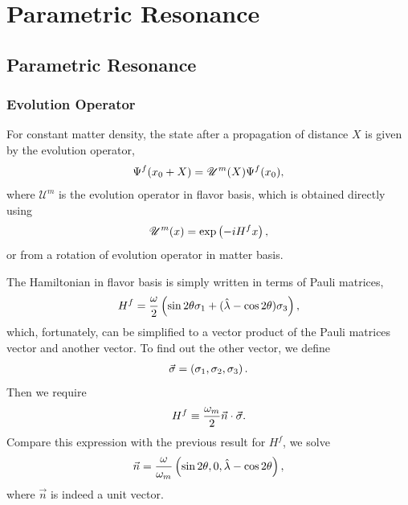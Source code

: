 \documentclass[letterpaper,12pt,english]{sphinxmanual}
\begin{document}
\chapter{Parametric Resonance}
\label{parametric:parametric-resonance}\label{parametric::doc}

\section{Parametric Resonance}
\label{parametric:index-0}\label{parametric:id1}

\subsection{Evolution Operator}
\label{parametric:evolution-operator}
For constant matter density, the state after a propagation of distance \(X\) is given by the evolution operator,
\begin{gather}
\begin{split}\Psi^{f}(x_0+X) = \mathscr{U}^{m} (X) \Psi^f(x_0),\end{split}\notag
\end{gather}
where \(\mathscr{U}^{m}\) is the evolution operator in flavor basis, which is obtained directly using
\begin{gather}
\begin{split}\mathscr{U}^m (x) = \exp\left(  -i H^f x \right),\end{split}\notag
\end{gather}
or from a rotation of evolution operator in matter basis.

The Hamiltonian in flavor basis is simply written in terms of Pauli matrices,
\begin{gather}
\begin{split}H^f = \frac{\omega}{2} \left( \sin 2\theta \sigma_1 + (\hat\lambda - \cos 2\theta) \sigma_3 \right),\end{split}\notag
\end{gather}
which, fortunately, can be simplified to a vector product of the Pauli matrices vector and another vector. To find out the other vector, we define
\begin{gather}
\begin{split}\vec \sigma = \left( \sigma_1, \sigma_2,\sigma_3 \right).\end{split}\notag
\end{gather}
Then we require
\begin{gather}
\begin{split}H^f \equiv \frac{\omega_m}{2} \vec n\cdot \vec \sigma .\end{split}\notag
\end{gather}
Compare this expression with the previous result for \(H^f\), we solve
\begin{gather}
\begin{split}\vec n = \frac{\omega}{\omega_m } \left( \sin 2\theta ,  0 , \hat\lambda  - \cos 2\theta  \right),\end{split}\notag
\end{gather}
where \(\vec n\) is indeed a unit vector.
\end{document}
